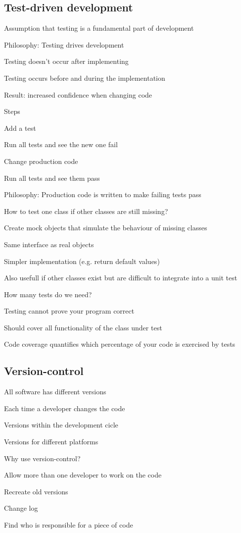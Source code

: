 \documentclass[10pt]{article}
\begin{document}
\subsection{Test-driven development}
\enumstart
	\item Assumption that testing is a fundamental part of development
	\item Philosophy: Testing drives development
	\enumstart
		\item Testing doesn't occur after implementing
		\item Testing occurs before and during the implementation
	\enumend
	\item Result: increased confidence when changing code
	\item Steps
	\enumstart
		\item Add a test
		\item Run all tests and see the new one fail
		\item Change production code
		\item Run all tests and see them pass
	\enumend
	\item Philosophy: Production code is written to make failing tests pass
	\item How to test one class if other classes are still missing?
	\enumstart
		\item Create mock objects that simulate the behaviour of missing classes
		\item Same interface as real objects
		\item Simpler implementation (e.g. return default values)
		\item Also usefull if other classes exist but are difficult to integrate into a unit test
	\enumend
	\item How many tests do we need?
	\enumstart
		\item Testing cannot prove your program correct
		\item Should cover all functionality of the class under test
		\item Code coverage quantifies which percentage of your code is exercised by tests
	\enumend
\enumend

\subsection{Version-control}
\enumstart
	\item All software has different versions
	\enumstart
		\item Each time a developer changes the code
		\item Versions within the development cicle
		\item Versions for different platforms
	\enumend
	\item Why use version-control?
	\enumstart
		\item Allow more than one developer to work on the code
		\item Recreate old versions
		\item Change log
		\item Find who is responsible for a piece of code
	\enumend
\enumend
\end{document}
